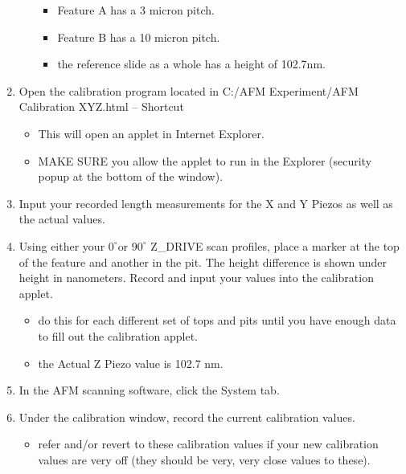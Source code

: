 \documentclass{../lab}
\begin{document}
\begin{enumerate}
\begin{itemize}
        \begin{itemize}
            \item Feature A has a 3 micron pitch.

            \item Feature B has a 10 micron pitch.

            \item the reference slide as a whole has a height of 102.7nm.
        \end{itemize}

    \end{itemize}

    \item Open the calibration program located in C:/AFM Experiment/AFM Calibration XYZ.html -- Shortcut

    \begin{itemize}
        \item This will open an applet in Internet Explorer.

        \item MAKE SURE you allow the applet to run in the Explorer (security popup at the bottom of the window).
    \end{itemize}

    \item Input your recorded length measurements for the X and Y Piezos as well as the actual values.

    \item Using either your $0^\circ$or $90^\circ$ Z\_DRIVE scan profiles, place a marker at the top of the feature and another in the pit.  The height difference is shown under height in nanometers. Record and input your values into the calibration applet.

    \begin{itemize}
        \item do this for each different set of tops and pits until you have enough data to fill out the calibration applet.

        \item the Actual Z Piezo value is 102.7 nm.
    \end{itemize}

    \item In the AFM scanning software, click the System tab.

    \item Under the calibration window, record the current calibration values.

    \begin{itemize}
        \item refer and/or revert to these calibration values if your new calibration values are very off (they should be very, very close values to these).
    \end{itemize}


\end{enumerate}
\end{document}
